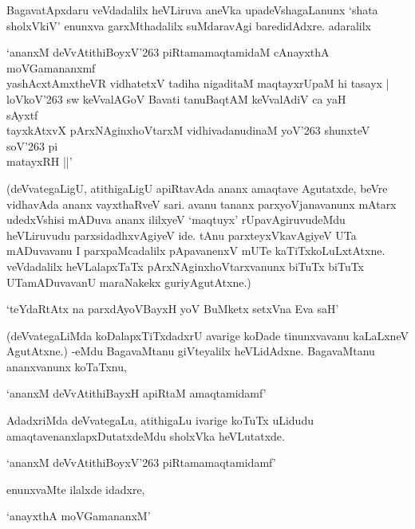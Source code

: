BagavatApxdaru veVdadalilx heVLiruva aneVka upadeVshagaLanunx `shata sholxVkiV' enunxva garxMthadalilx suMdaravAgi baredidAdxre. adaralilx

\begin{shloka}
`ananxM deVvAtithiBoyxV\char'263 piRtamamaqtamidaM cAnayxthA\\
\hspace{5.3cm} moVGamananxmf\\
yashAcxtAmxtheVR vidhatetxV tadiha nigaditaM maqtayxrUpaM hi tasayx |\\
loVkoV\char'263 sw keVvalAGoV Bavati tanuBaqtAM keVvalAdiV ca yaH\\
\hspace{5.3cm} sAyxtf\\
tayxkAtxvX pArxNAginxhoVtarxM vidhivadanudinaM yoV\char'263 shunxteV soV\char'263 pi\\
\hspace{5.3cm} matayxRH ||'
\end{shloka}

(deVvategaLigU, atithigaLigU apiRtavAda ananx amaqtave Agutatxde, beVre vidhavAda ananx vayxthaRveV sari. avanu tananx parxyoVjanavanunx mAtarx udedxVshisi mADuva ananx ililxyeV `maqtuyx' rUpavAgiruvudeMdu heVLiruvudu parxsidadhxvAgiyeV ide. tAnu parxteyxVkavAgiyeV UTa mADuvavanu I parxpaMcadalilx pApavanenxV mUTe kaTiTxkoLuLxtAtxne. veVdadalilx heVLalapxTaTx pArxNAginxhoVtarxvanunx biTuTx biTuTx UTamADuvavanU maraNakekx guriyAgutAtxne.)

\begin{shloka}
`teYdaRtAtx na parxdAyoVBayxH yoV BuMketx setxVna Eva saH'
\end{shloka}

(deVvategaLiMda koDalapxTiTxdadxrU avarige koDade tinunxvavanu kaLaLxneV AgutAtxne.) -eMdu BagavaMtanu giVteyalilx heVLidAdxne. BagavaMtanu ananxvanunx koTaTxnu,

\begin{shloka}
`ananxM deVvAtithiBayxH apiRtaM amaqtamidamf'
\end{shloka}

AdadxriMda deVvategaLu, atithigaLu ivarige koTuTx uLidudu amaqtavenanxlapxDutatxdeMdu sholxVka heVLutatxde.

\begin{shloka}
`ananxM deVvAtithiBoyxV\char'263 piRtamamaqtamidamf'
\end{shloka}

enunxvaMte ilalxde idadxre,

\begin{shloka}
`anayxthA moVGamananxM'
\end{shloka}

